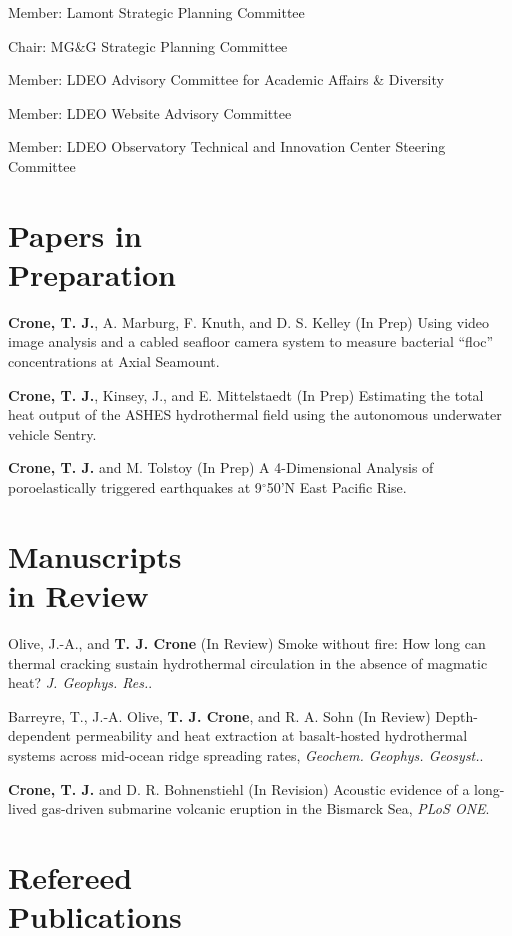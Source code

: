 \documentclass[11pt]{res}
\begin{document}
\begin{resume}
Member: Lamont Strategic Planning Committee

Chair: MG\&G Strategic Planning Committee

Member: LDEO Advisory Committee for Academic Affairs \& Diversity

Member: LDEO Website Advisory Committee

Member: LDEO Observatory Technical and Innovation Center Steering Committee
\vspace{0.2in}

\section{\sc Papers in\\Preparation}

{\bf Crone, T. J.}, A. Marburg, F. Knuth, and D. S. Kelley (In Prep) Using video image analysis and a cabled seafloor camera system to measure bacterial ``floc'' concentrations at Axial Seamount.

{\bf Crone, T. J.}, Kinsey, J., and E. Mittelstaedt (In Prep) Estimating the total heat output of the ASHES hydrothermal field using the autonomous underwater vehicle Sentry.

{\bf Crone, T. J.} and M. Tolstoy (In Prep) A 4-Dimensional Analysis of poroelastically triggered earthquakes at 9$^\circ$50'N East Pacific Rise.

\section{\sc Manuscripts\\in Review}

Olive, J.-A., and {\bf T. J. Crone} (In Review) Smoke without fire: How long can thermal cracking sustain hydrothermal circulation in the absence of magmatic heat? {\em J. Geophys. Res.}.

Barreyre, T., J.-A. Olive, {\bf T. J. Crone}, and R. A. Sohn (In Review) Depth-dependent permeability and heat extraction at basalt-hosted hydrothermal systems across mid-ocean ridge spreading rates, {\em Geochem. Geophys. Geosyst.}.

{\bf Crone, T. J.} and D. R. Bohnenstiehl (In Revision) Acoustic evidence of a long-lived gas-driven submarine volcanic eruption in the Bismarck Sea, {\em PLoS ONE}.

\section{\sc Refereed\\Publications}


\end{resume}
\end{document}
